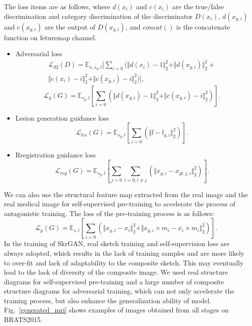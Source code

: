 \documentclass[runningheads]{llncs}
\begin{document}
	The loss items are as follows, where $d(x_{i})$ and $c(x_{i})$ are the true/false discrimination and category discrimination of the discriminator $D(x_i)$, $d(x_{g, i})$ and $c(x_{g,i})$ are the output of $D(x_{g,i})$, and $concat()$ is the concatenate function on feturemap channel. 
	\begin{itemize}
		\item{Adversarial loss}
		\begin{equation}
		\begin{split}
		\mathcal{L}_{d2}(D)=\mathbb{E}_{x,s_g,l}[\sum\limits_{i=0}(\Vert{d(x_i)-1}\Vert_{2}^{2}+\Vert{d(x_{g,i})}\Vert_{2}^{2}+\\
		\Vert{c(x_i)-i}\Vert_{2}^{2}+\Vert{c(x_{g,i})-i}\Vert_{2}^{2})],
		\end{split}
		\end{equation}
		\begin{equation}
		\mathcal{L}_{g}(G)=\mathbb{E}_{s_g,l}[\sum\limits_{i=0}(\Vert{d(x_{g,i})-1}\Vert_{2}^{2}+\Vert{c(x_{g,i})-i}\Vert_{2}^{2})].
		\end{equation}
		\item{Lesion generation guidance loss}
		\begin{equation}
		\mathcal{L}_{les}(G)=\mathbb{E}_{s_g,l}[\sum\limits_{i=0}(\Vert{l-l_{g,i}}\Vert_{2}^{2})].
		\end{equation}
		\item{Rregistration guidance loss}
		\begin{equation}
		\mathcal{L}_{reg}(G)=\mathbb{E}_{s_g,l}[\sum\limits_{j=0}\sum\limits_{i=0,i\neq j}(\Vert{x_{g,i}-x_{gt,j,i}}\Vert_{2}^{2})].
		\end{equation}
	\end{itemize}
	We can also use the structural feature map extracted from the real image and the real medical image for self-supervised pre-training to accelerate the process of antagonistic training. The loss of the pre-training process is as follows:
	\begin{equation}
	\mathcal{L}_{p}(G)=\mathbb{E}_{s,l}[\sum\limits_{i=0}(\Vert{x_{g,i}-x_i}\Vert_{2}^{2}+\Vert{x_{g,i}\times m_i-x_{i}\times m_i}\Vert_{2}^{2})].
	\end{equation}
	In the training of SkrGAN\cite{96zhang2019skrgan:}, real sketch training and self-supervision loss are always adopted, which results in the lack of training samples and are more likely to over-fit and lack of adaptability to the composite sketch. This may eventually lead to the lack of diversity of the composite image. We used real structure diagrams for self-supervised pre-training and a large number of composite structure diagrams for adversarial training, which can not only accelerate the training process, but also enhance the generalization ability of model. Fig.~\ref{generated_mri} shows examples of images obtained from all stages on BRATS2015.
\end{document}

